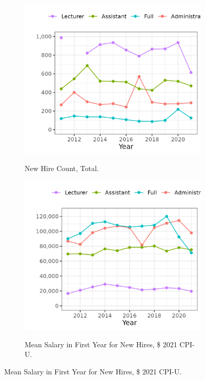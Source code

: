\begin{figure}[h!]
    \centering
    \singlespacing
    \caption{Trends in New Hires at Illinois Public Universities 2011-2021.}
    \begin{subfigure}[b]{0.495\textwidth}
        \centering
        \caption{New Hire Count, Total.}
        \includegraphics[width=\textwidth]{figures/newhire-count-illinois.png}
        \label{fig:newhire-count-illinois}
    \end{subfigure}
    \begin{subfigure}[b]{0.495\textwidth}
        \centering
        \caption{Mean Salary in First Year for New Hires, \$ 2021 CPI-U.}
        \includegraphics[width=\textwidth]{figures/newhire-salary-illinois.png}
        \label{fig:newhire-salary-illinois}
    \end{subfigure}
    \label{fig:newhire-illinois}
\end{figure}

